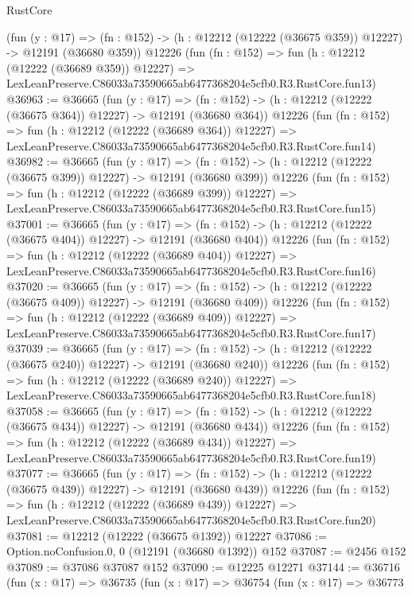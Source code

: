 \begin{lexlean}{RustCore}
\begin{coremodule}
    (fun (y : @17) =>
    (fn : @152) -> (h : @12212 (@12222 (@36675 @359)) @12227) -> @12191 (@36680 @359))
    @12226
    (fun (fn : @152) =>
    fun (h : @12212 (@12222 (@36689 @359)) @12227) =>
    LexLeanPreserve.C86033a73590665ab6477368204e5cfb0.R3.RustCore.fun13)
@36963 := @36665
    (fun (y : @17) =>
    (fn : @152) -> (h : @12212 (@12222 (@36675 @364)) @12227) -> @12191 (@36680 @364))
    @12226
    (fun (fn : @152) =>
    fun (h : @12212 (@12222 (@36689 @364)) @12227) =>
    LexLeanPreserve.C86033a73590665ab6477368204e5cfb0.R3.RustCore.fun14)
@36982 := @36665
    (fun (y : @17) =>
    (fn : @152) -> (h : @12212 (@12222 (@36675 @399)) @12227) -> @12191 (@36680 @399))
    @12226
    (fun (fn : @152) =>
    fun (h : @12212 (@12222 (@36689 @399)) @12227) =>
    LexLeanPreserve.C86033a73590665ab6477368204e5cfb0.R3.RustCore.fun15)
@37001 := @36665
    (fun (y : @17) =>
    (fn : @152) -> (h : @12212 (@12222 (@36675 @404)) @12227) -> @12191 (@36680 @404))
    @12226
    (fun (fn : @152) =>
    fun (h : @12212 (@12222 (@36689 @404)) @12227) =>
    LexLeanPreserve.C86033a73590665ab6477368204e5cfb0.R3.RustCore.fun16)
@37020 := @36665
    (fun (y : @17) =>
    (fn : @152) -> (h : @12212 (@12222 (@36675 @409)) @12227) -> @12191 (@36680 @409))
    @12226
    (fun (fn : @152) =>
    fun (h : @12212 (@12222 (@36689 @409)) @12227) =>
    LexLeanPreserve.C86033a73590665ab6477368204e5cfb0.R3.RustCore.fun17)
@37039 := @36665
    (fun (y : @17) =>
    (fn : @152) -> (h : @12212 (@12222 (@36675 @240)) @12227) -> @12191 (@36680 @240))
    @12226
    (fun (fn : @152) =>
    fun (h : @12212 (@12222 (@36689 @240)) @12227) =>
    LexLeanPreserve.C86033a73590665ab6477368204e5cfb0.R3.RustCore.fun18)
@37058 := @36665
    (fun (y : @17) =>
    (fn : @152) -> (h : @12212 (@12222 (@36675 @434)) @12227) -> @12191 (@36680 @434))
    @12226
    (fun (fn : @152) =>
    fun (h : @12212 (@12222 (@36689 @434)) @12227) =>
    LexLeanPreserve.C86033a73590665ab6477368204e5cfb0.R3.RustCore.fun19)
@37077 := @36665
    (fun (y : @17) =>
    (fn : @152) -> (h : @12212 (@12222 (@36675 @439)) @12227) -> @12191 (@36680 @439))
    @12226
    (fun (fn : @152) =>
    fun (h : @12212 (@12222 (@36689 @439)) @12227) =>
    LexLeanPreserve.C86033a73590665ab6477368204e5cfb0.R3.RustCore.fun20)
@37081 := @12212 (@12222 (@36675 @1392)) @12227
@37086 := Option.noConfusion.{0, 0} (@12191 (@36680 @1392)) @152
@37087 := @2456 @152
@37089 := @37086 @37087 @152
@37090 := @12225 @12271
@37144 := @36716
    (fun (x : @17) =>
    @36735
      (fun (x : @17) =>
      @36754
        (fun (x : @17) =>
        @36773

\end{coremodule}
\end{lexlean}
